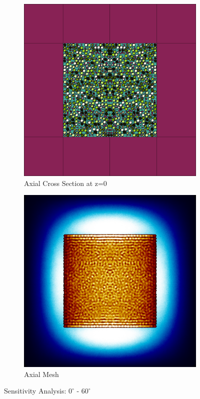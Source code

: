 \begin{figure}[h!]
\begin{subfigure}{0.45\textwidth}
  \includegraphics[width=0.95\linewidth]{figures/0-60/0-60-v}
  \caption{Axial Cross Section at z=0 }
  \label{fig:0-60-v}
\end{subfigure}
%
\begin{subfigure}{0.45\textwidth}
  \includegraphics[width=0.95\linewidth]{figures/0-60/0-60-vm}
  \caption{Axial Mesh}
  \label{fig:0-60-vm}
\end{subfigure}
%
\caption{Sensitivity Analysis: $0^{\circ}$ - $60^{\circ}$}
\label{fig:0-60}
\end{figure}